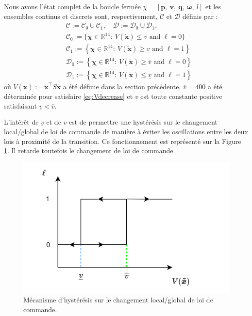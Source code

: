 Nous avons l'état complet de la boucle fermée $\chi = \left[\boldsymbol{p},~ \boldsymbol{v},~ \boldsymbol{q},~  \boldsymbol{\omega},~ l\right]$ et les ensembles continus et discrets sont, respectivement, $\mathcal{C}$ et $\mathcal{D}$ définis par :
\begin{align*}
    & \mathcal{C} := \mathcal{C}_{0} \cup \mathcal{C}_{1}, \quad \mathcal{D} := \mathcal{D}_{0} \cup \mathcal{D}_{1},\\
   & \mathcal{C}_{0} :=\{\boldsymbol{\chi} \in \mathbb{R}^{14}:~ V(\boldsymbol{\tilde x}) \le \overline{v} \mbox{ and } \ell=0\}\\
   & \mathcal{C}_{1} :=\left\{\boldsymbol{\chi} \in \mathbb{R}^{14}:~ V(\boldsymbol{\tilde x}) \ge \underline{v} \mbox{ and } \ell=1 \right\}\\
   & \mathcal{D}_{0} :=\left\{\boldsymbol{\chi} \in \mathbb{R}^{14}:~ V(\boldsymbol{\tilde x}) \geq \overline{v}\mbox{ and } \ell=0 \right\}\\
   & \mathcal{D}_{1} :=\left\{\boldsymbol{\chi} \in \mathbb{R}^{14}:~ V(\boldsymbol{\tilde x}) \leq \underline{v}\mbox{ and } \ell=1 \right\}
\end{align*}
où $V(\boldsymbol{\tilde x}) := \boldsymbol{\tilde x}^\top S \boldsymbol{\tilde x}$  a été définie dans la section précédente, $\overline{v}=400$ a été déterminée pour satisfaire \eqref{eq:Vdecrease} et $\underline{v}$ est toute constante positive satisfaisant $\underline{v}<\overline{v}$.

L'intérêt de $\underline{v}$ et de $\overline{v}$ est de permettre une hystérésis sur le changement local/global de loi de commande de manière à éviter les oscillations entre les deux lois à proximité de la transition. Ce fonctionnement est représenté sur la Figure \ref{fig:hysteresis}. Il retarde toutefois le changement de loi de commande.

\begin{figure}[ht!]
  \centering
  \includegraphics[trim=0cm 0cm 0cm 0cm,clip,width=0.8\columnwidth]{figures/hysteresis.png}
  \caption{Mécanisme d'hystérésis sur le changement local/global de loi de commande.}
  \label{fig:hysteresis}
\end{figure}

